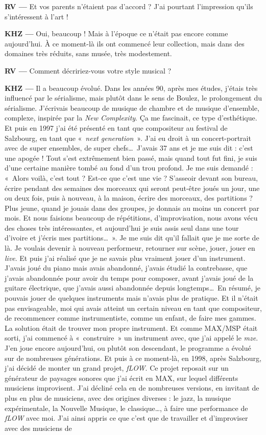 \documentclass[a4paper,12pt]{article}
\newcommand{\guill}[1]{«~#1~»}
\newcommand{\maze}[0]{\emph{m\symbol{64}ze\textdegree2}}
\begin{document}
\textbf{RV ---} Et vos parents n'étaient pas d'accord ? J'ai pourtant l'impression qu'ils s'intéressent à l'art !

\textbf{KHZ ---} Oui, beaucoup ! Mais à l'époque ce n'était pas encore comme aujourd'hui. À ce moment-là ils ont commencé leur collection, mais dans des domaines très réduits, sans musée, très modestement.

\textbf{RV ---} Comment décririez-vous votre style musical ?

\textbf{KHZ ---} Il a beaucoup évolué. Dans les années 90, après mes études, j'étais très influencé par le sérialisme, mais plutôt dans le sens de Boulez, le prolongement du sérialisme. J'écrivais beaucoup de musique de chambre et de musique d'ensemble, complexe, inspirée par la \emph{New Complexity}. Ça me fascinait, ce type d'esthétique. Et puis en 1997 j'ai été présenté en tant que compositeur au festival de Salzbourg, en tant que \guill{\emph{next generation}}. J'ai eu droit à un concert-portrait avec de super ensembles, de super chefs\dots~J'avais 37 ans et je me suis dit : c'est une apogée ! Tout s'est extrêmement bien passé, mais quand tout fut fini, je suis d'une certaine manière tombé au fond d'un trou profond. Je me suis demandé : \guill{Alors voilà, c'est tout ? Est-ce que c'est une vie ? S'asseoir devant son bureau, écrire pendant des semaines des morceaux qui seront peut-être joués un jour, une ou deux fois, puis à nouveau, à la maison, écrire des morceaux, des partitions ? Plus jeune, quand je jouais dans des groupes, je donnais au moins un concert par mois. Et nous faisions beaucoup de répétitions, d'improvisation, nous avons vécu des choses très intéressantes, et aujourd'hui je suis assis seul dans une tour d'ivoire et j'écris mes partitions\dots}. Je me suis dit qu'il fallait que je me sorte de là. Je voulais devenir à nouveau performeur, retourner sur scène, jouer, jouer en \emph{live}. Et puis j'ai réalisé que je ne savais plus vraiment jouer d'un instrument. J'avais joué du piano mais avais abandonné, j'avais étudié la contrebasse, que j'avais abandonnée pour avoir du temps pour composer, avant j'avais joué de la guitare électrique, que j'avais aussi abandonnée depuis longtemps\dots~En résumé, je pouvais jouer de quelques instruments mais n'avais plus de pratique. Et il n'était pas envisageable, moi qui avais atteint un certain niveau en tant que compositeur, de recommencer comme instrumentiste, comme un enfant, de faire mes gammes. La solution était de trouver mon propre instrument. Et comme MAX/MSP était sorti, j'ai commencé à \guill{construire} un instrument avec, que j'ai appelé le \maze. J'en joue encore aujourd'hui, ou plutôt son descendant, le programme a évolué sur de nombreuses générations. Et puis à ce moment-là, en 1998, après Salzbourg, j'ai décidé de monter un grand projet, \emph{fLOW}. Ce projet reposait sur un générateur de paysages sonores que j'ai écrit en MAX, sur lequel différents musiciens improvisent. J'ai décliné cela en de nombreuses versions, en invitant de plus en plus de musiciens, avec des origines diverses : le jazz, la musique expérimentale, la Nouvelle Musique, le classique\dots, à faire une performance de \emph{fLOW} avec moi. J'ai ainsi appris ce que c'est que de travailler et d'improviser avec des musiciens de 
\end{document}
